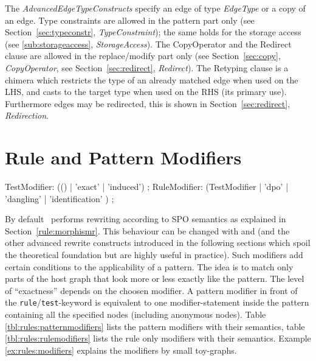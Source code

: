 The \emph{AdvancedEdgeTypeConstructs} specify an edge of type \emph{EdgeType} or a copy of an edge.
Type constraints are allowed in the pattern part only (see Section~\ref{sec:typeconstr}, \emph{TypeConstraint}); 
the same holds for the storage access (see \ref{sub:storageaccess}, \emph{StorageAccess}).
The CopyOperator and the Redirect clause are allowed in the replace/modify part only (see Section~\ref{sec:copy}, \emph{CopyOperator}, see Section~\ref{sec:redirect}, \emph{Redirect}).
The Retyping clause is a chimera which restricts the type of an already matched edge when used on the LHS, and casts to the target type when used on the RHS (its primary use).
Furthermore edges may be redirected, this is shown in Section~\ref{sec:redirect}, \emph{Redirection}.


\section{Rule and Pattern Modifiers}
\label{sct:patternmodifier}

\begin{rail}
  TestModifier: (() | 'exact' | 'induced') ;
  RuleModifier: (TestModifier | 'dpo' | 'dangling' | 'identification' ) ;
\end{rail}

By default \GrG\ performs rewriting according to SPO semantics as explained in Section~\ref{rule:morphismr}.
This behaviour can be changed with  and  (and the other advanced rewrite constructs introduced in the following sections which spoil the theoretical foundation but are highly useful in practice).
Such modifiers add certain conditions to the applicability of a pattern.
The idea is to match only parts of the host graph that look more or less exactly like the pattern.
The level of ``exactness'' depends on the choosen modifier.
A pattern modifier in front of the \texttt{rule}/\texttt{test}-keyword is equivalent to one modifier-statement inside the pattern containing all the specified nodes (including anonymous nodes).
Table \ref{tbl:rules:patternmodifiers} lists the pattern modifiers with their semantics, table \ref{tbl:rules:rulemodifiers} lists the rule only modifiers with their semantics.
Example \ref{ex:rules:modifiers} explains the modifiers by small toy-graphs.

